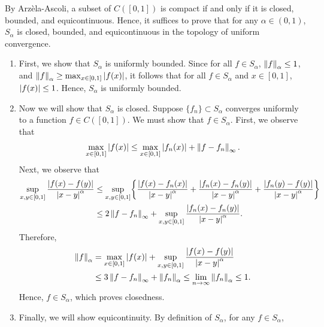 \documentclass{article}
\begin{document}
\begin{solutions}
	By Arz{\`e}la-Ascoli, a subset of $C([0,1])$ is compact if and only if it is closed, bounded, and equicontinuous. Hence, it suffices to prove that for any $\alpha \in (0,1)$, $S_{\alpha}$ is closed, bounded, and equicontinuous in the topology of uniform convergence. \vspace{-0.1cm}
		\begin{enumerate}[itemsep =-2pt,label = (\roman{*})]
			\item First, we show that $S_{\alpha}$ is uniformly bounded. Since for all $f \in S_{\alpha}$, $\left\Vert f \right\Vert_{\alpha} \leq 1$, and $\left\Vert f \right\Vert_{\alpha} \geq \max_{x \in [0,1]}|f(x)|$, it follows that for all $f \in S_{\alpha}$ and $x \in [0,1]$, $\left| f(x) \right| \leq 1$. Hence, $S_{\alpha}$ is uniformly bounded. 
			\item Now we will show that $S_{\alpha}$ is closed. Suppose $\{f_{n}\}\subset S_{\alpha}$ converges uniformly to a function $f \in C([0,1])$. We must show that $f \in S_{\alpha}$. First, we observe that 
				\begin{equation}
					\max_{x \in [0,1]}|f(x)| \leq \max_{x \in [0,1]}\left| f_{n}(x) \right| + \left\Vert f - f_{n} \right\Vert_{\infty}. 
				\end{equation}
			Next, we observe that 
				\begin{align}
					\begin{split}
						\sup_{x, y \in [0,1]}\frac{\abs{f(x) - f(y)}}{\abs{x -y}^{\alpha}} &\leq \sup_{x, y \in [0,1]}\brac*{\frac{\abs{f(x) - f_{n}(x)}}{\abs{x - y}^{\alpha}} + \frac{\abs{f_{n}(x) - f_{n}(y)}}{\abs{x - y}^{\alpha}} + \frac{\abs{f_{n}(y) - f(y)}}{\abs{x - y}^{\alpha}}} \\
						&\leq 2\norm{f - f_{n}}_{\infty} + \sup_{x, y \in [0,1]}\frac{\abs{f_{n}(x) - f_{n}(y)}}{\abs{x - y}^{\alpha}}. 
					\end{split}
				\end{align}
			Therefore, 
				\begin{align}
					\begin{split}
						\left\Vert f \right\Vert_{\alpha} &= \max_{x \in [0,1]}\left| f(x) \right| + \sup_{x, y \in [0,1]}\frac{\left| f(x) - f(y) \right|}{\left| x - y \right|^{\alpha}} \\
						&\leq 3\left\Vert f - f_{n} \right\Vert_{\infty} + \left\Vert f_{n} \right\Vert_{\alpha} \leq \lim_{n \to \infty}\left\Vert f_{n} \right\Vert_{\alpha} \leq 1. 
					\end{split}
				\end{align}
			Hence, $f \in S_{\alpha}$, which proves closedness. 
			\item Finally, we will show equicontinuity. By definition of $S_{\alpha}$, for any $f \in S_{\alpha}$, 

\end{enumerate}
\end{solutions}
\end{document}
